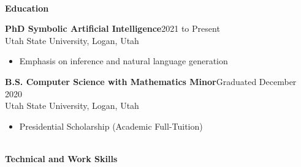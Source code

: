 \documentclass[letterpaper,11pt]{article}
\begin{document}


\begin{Large}\textbf{\\Education}\end{Large}

\textbf{PhD Symbolic Artificial Intelligence}\hfill 2021 to Present\\
Utah State University, Logan, Utah
\begin{itemize}[noitemsep,topsep=0pt]
	\item Emphasis on inference and natural language generation\\
\end{itemize}

\textbf{B.S. Computer Science with Mathematics Minor}\hfill Graduated December 2020\\
Utah State University, Logan, Utah%
\begin{itemize}[noitemsep,topsep=0pt]
	\item Presidential Scholarship (Academic Full-Tuition)
\end{itemize}



\begin{Large}\textbf{\\Technical and Work Skills}\end{Large}
\end{document}
